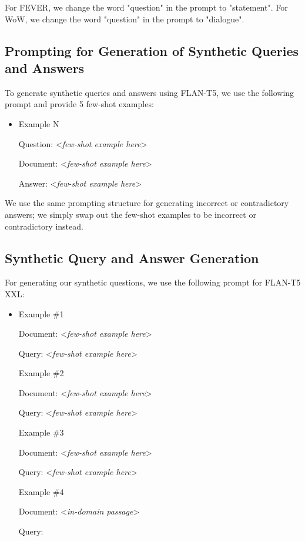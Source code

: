For FEVER, we change the word "question" in the prompt to "statement". 
For WoW, we change the word "question" in the prompt to "dialogue".

\subsection{Prompting for Generation of Synthetic Queries and Answers}
\label{sec:flan_generate_synth_data}

To generate synthetic queries and answers using FLAN-T5, we use the following prompt and provide 5 few-shot examples:

\begin{itemize}
    \item Example N

    Question: <\textit{few-shot example here}>

    Document: <\textit{few-shot example here}>

    Answer: <\textit{few-shot example here}>
    
\end{itemize}

We use the same prompting structure for generating incorrect or contradictory answers; we simply swap out the few-shot examples to be incorrect or contradictory instead.

\subsection{Synthetic Query and Answer Generation}
\label{sec:generate_synthetic_data}

For generating our synthetic questions, we use the following prompt for FLAN-T5 XXL:

\begin{itemize}
    \item Example \#1
    
    Document: <\textit{few-shot example here}>
    
    Query: <\textit{few-shot example here}>
    
    Example \#2
    
    Document: <\textit{few-shot example here}>
    
    Query: <\textit{few-shot example here}>

    Example \#3
    
    Document: <\textit{few-shot example here}>
    
    Query: <\textit{few-shot example here}>

    Example \#4
    
    Document: <\textit{in-domain passage}>
    
    Query: 
\end{itemize}


